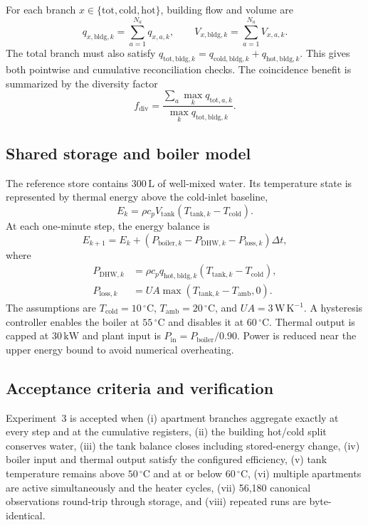 \documentclass[11pt,a4paper]{article}
\begin{document}
For each branch $x\in\{\mathrm{tot},\mathrm{cold},\mathrm{hot}\}$, building
flow and volume are
\begin{equation}
  q_{x,\mathrm{bldg},k}=\sum_{a=1}^{N_a}q_{x,a,k},\qquad
  V_{x,\mathrm{bldg},k}=\sum_{a=1}^{N_a}V_{x,a,k}.
\end{equation}
The total branch must also satisfy
$q_{\mathrm{tot},\mathrm{bldg},k}=
q_{\mathrm{cold},\mathrm{bldg},k}+q_{\mathrm{hot},\mathrm{bldg},k}$.
This gives both pointwise and cumulative reconciliation checks. The coincidence
benefit is summarized by the diversity factor
\begin{equation}
  f_{\mathrm{div}}=
  \frac{\sum_a\max_k q_{\mathrm{tot},a,k}}
       {\max_k q_{\mathrm{tot},\mathrm{bldg},k}}.
\end{equation}

\subsection{Shared storage and boiler model}
The reference store contains $300\,\mathrm{L}$ of well-mixed water. Its
temperature state is represented by thermal energy above the cold-inlet
baseline,
\begin{equation}
  E_k=\rho c_p V_{\mathrm{tank}}
  \left(T_{\mathrm{tank},k}-T_{\mathrm{cold}}\right).
\end{equation}
At each one-minute step, the energy balance is
\begin{equation}
  E_{k+1}=E_k+
  \left(P_{\mathrm{boiler},k}-P_{\mathrm{DHW},k}
        -P_{\mathrm{loss},k}\right)\Delta t,
\end{equation}
where
\begin{align}
  P_{\mathrm{DHW},k}
    &=\rho c_p q_{\mathrm{hot},\mathrm{bldg},k}
      \left(T_{\mathrm{tank},k}-T_{\mathrm{cold}}\right),\\
  P_{\mathrm{loss},k}
    &=UA\max\left(T_{\mathrm{tank},k}-T_{\mathrm{amb}},0\right).
\end{align}
The assumptions are $T_{\mathrm{cold}}=10\,^{\circ}\mathrm{C}$,
$T_{\mathrm{amb}}=20\,^{\circ}\mathrm{C}$, and
$UA=3\,\mathrm{W\,K^{-1}}$. A hysteresis controller enables the boiler at
$55\,^{\circ}\mathrm{C}$ and disables it at $60\,^{\circ}\mathrm{C}$.
Thermal output is capped at $30\,\mathrm{kW}$ and plant input is
$P_{\mathrm{in}}=P_{\mathrm{boiler}}/0.90$. Power is reduced near the upper
energy bound to avoid numerical overheating.

\subsection{Acceptance criteria and verification}
Experiment~3 is accepted when (i) apartment branches aggregate exactly at every
step and at the cumulative registers, (ii) the building hot/cold split
conserves water, (iii) the tank balance closes including stored-energy change,
(iv) boiler input and thermal output satisfy the configured efficiency, (v)
tank temperature remains above $50\,^{\circ}\mathrm{C}$ and at or below
$60\,^{\circ}\mathrm{C}$, (vi) multiple apartments are active
simultaneously and the heater cycles, (vii) 56,180 canonical observations
round-trip through storage, and (viii) repeated runs are byte-identical.
\end{document}
